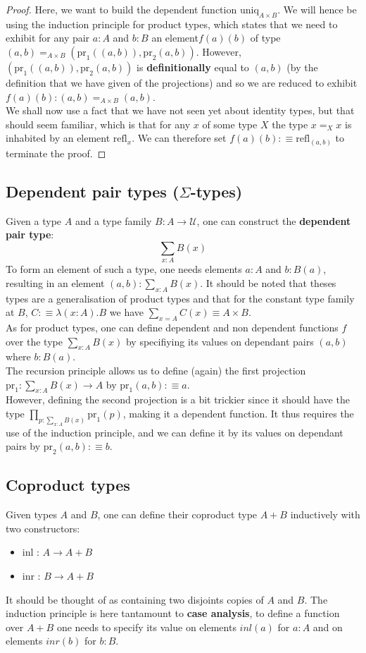 \documentclass{report}
\begin{document}
\begin{proof}
     Here, we want to build the dependent function $\mathrm{uniq}_{A\times B}$. We will hence be using the induction principle for product types, which states that we need to exhibit for any pair $a : A$ and $b:B$ an element$f(a)(b)$ of type $(a,b)=_{A \times B} (\mathrm{pr}_1((a,b)),\mathrm{pr}_2(a,b))$. However,  $(\mathrm{pr}_1((a,b)),\mathrm{pr}_2(a,b))$ is \textbf{definitionally} equal to $(a,b)$ (by the definition that we have given of the projections) and so we are reduced to exhibit $f(a)(b) : (a,b)=_{A \times B} (a,b)$.\\ 
     We shall now use a fact that we have not seen yet about identity types, but that should seem familiar, which is that for any $x$ of some type $X$ the type $x=_{X}x$ is inhabited by an element $\mathrm{refl}_x$. We can therefore set $f(a)(b) :\equiv \mathrm{refl}_{(a,b)}$ to terminate the proof.
\end{proof}
\subsection{Dependent pair types ($\Sigma$-types)}
Given a type $A$ and a type family $B : A \rightarrow \mathcal{U}$, one can construct the \textbf{dependent pair type}: 
$$\sum_{x : A} B(x)$$
To form an element of such a type, one needs elements $a : A$ and $b : B(a)$, resulting in an element $(a,b) : \sum_{x : A} B(x)$. It should be noted that theses types are a generalisation of product types and that for the constant type family at $B$, $C :\equiv \lambda (x : A).B$ we have $\sum_{x = A} C(x)\equiv A \times B$.\\
As for product types, one can define dependent and non dependent functions $f$ over the type $\sum_{x : A} B(x)$ by specifiying its values on dependant pairs $(a,b)$ where $b:B(a)$.\\ 
The recursion principle allows us to define (again) the first projection $\mathrm{pr}_1 : \sum_{x : A} B(x) \rightarrow A$ by $\mathrm{pr}_1 (a,b) :\equiv a$.\\
However, defining the second projection is a bit trickier since it should have the type $\prod_{p : \sum_{x : A} B(x)} \mathrm{pr}_1(p)$, making it a dependent function. It thus requires the use of the induction principle, and we can define it by its values on dependant pairs by $\mathrm{pr}_2(a,b) :\equiv b$.
\subsection{Coproduct types}
Given types $A$ and $B$, one can define their coproduct type $A+B$ inductively with two constructors:
\begin{itemize}
  \item inl : $A \rightarrow A+B$
  \item inr : $B \rightarrow A+B$
\end{itemize}
It should be thought of as containing two disjoints copies of $A$ and $B$. The induction principle is here tantamount to \textbf{case analysis}, to define a function over $A+B$ one needs to specify its value on elements $inl(a)$ for $a:A$ and on elements $inr(b)$ for $b:B$. 
\end{document}
